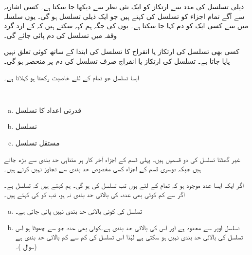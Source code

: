 ذیلی تسلسل کی مدد سے ارتکاز کو ایک نئی نظر سے دیکھا جا سکتا ہے۔ کسی اشاریہ  سے آگے  تمام اجزاء کو تسلسل کی  کہتے ہیں جو ایک ذیلی تسلسل ہو گی۔ یوں سلسلہ  میں سے کسی ایک کو دم کہا جا سکتا ہے۔ یوں  کی جگہ ہم کہہ سکتے ہیں کہ  کے ارد گرد  وقفہ میں تسلسل کی دم پائی جائے گی۔

کسی بھی تسلسل کی ارتکاز یا انفراج کا تسلسل کی ابتدا کے ساتھ کوئی تعلق نہیں پایا جاتا ہے۔ تسلسل کی ارتکاز یا انفراج صرف تسلسل کی دم پر منحصر ہو گی۔

ایسا تسلسل جو تمام  کے لئے  خاصیت رکھتا ہو  کہلاتا ہے۔ 

\\
\begin{enumerate}[a.]
\item
قدرتی اعداد کا تسلسل 
\item
تسلسل 
\item
مستقل تسلسل 
\end{enumerate}

غیر گھٹتا تسلسل کی دو قسمیں ہیں۔ پہلی قسم کے اجزاء آخر کار ہر متناہی حد بندی سے بڑھ جاتے ہیں جبکہ دوسری قسم کے اجزاء کسی مخصوص حد بندی سے تجاوز نہیں کرتے ہیں۔

اگر ایک ایسا عدد  موجود ہو کہ تمام  کے لئے  ہوں تب تسلسل  کی   ہو گی۔ ہم کہتے ہیں کہ تسلسل   ہے۔ اگر  سے کم کوئی بھی عدد،  کی بالائی حد بندی نہ ہو، تب  کو  کی  کہتے ہیں۔

\begin{enumerate}[a.]
\item
تسلسل  کی کوئی بالائی حد بندی نہیں پائی جاتی ہے۔
\item
تسلسل  اوپر سے محدود ہے اور اس کی بالائی حد بندی  ہے۔کوئی بھی عدد جو  سے چھوٹا ہو اس تسلسل کی بالائی حد بندی نہیں ہو سکتی ہے لہٰذا اس تسلسل کی کم سے کم بالائی حد بندی  ہے (سوال )۔
\end{enumerate}

